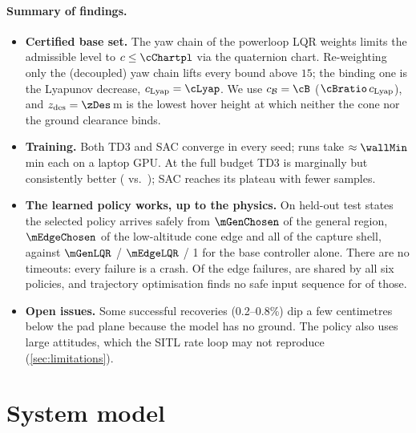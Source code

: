 \documentclass[11pt,a4paper]{article}
\newcommand{\B}{\mathcal{B}}
\newcommand{\zd}{z_{\mathrm{des}}}
\begin{document}
\paragraph{Summary of findings.}
\begin{itemize}
\item \textbf{Certified base set.} The yaw chain of the powerloop LQR weights limits the admissible level to
$c\le\cChartpl$ via the quaternion chart. Re-weighting only the (decoupled) yaw chain lifts every bound
above $15$; the binding one is the Lyapunov decrease, $c_{\mathrm{Lyap}}=\cLyap$. We use $c_{\B}=\cB$
($\cBratio\,c_{\mathrm{Lyap}}$), and $\zd=\zDes$\,m is the lowest hover height at which neither the cone
nor the ground clearance binds.
\item \textbf{Training.} Both TD3 and SAC converge in every seed; runs take $\approx\wallMin$\,min each on a
laptop GPU. At the full budget TD3 is marginally but consistently better (\muTDthree{} vs.\ \muSAC{}); SAC
reaches its plateau with fewer samples.
\item \textbf{The learned policy works, up to the physics.} On held-out test states the selected policy
arrives safely from $\mGenChosen$ of the general region, $\mEdgeChosen$ of the low-altitude cone edge and
all of the capture shell, against $\mGenLQR$ / $\mEdgeLQR$ / 1 for the base controller alone. There are no
timeouts: every failure is a crash. Of the \edgeFailChosen{} edge failures, \edgeShared{} are shared by all six
policies, and trajectory optimisation finds no safe input sequence for \edgeNonviable{} of those.
\item \textbf{Open issues.} Some successful recoveries (0.2--0.8\%) dip a few centimetres below the pad
plane because the model has no ground. The policy also uses large attitudes, which the SITL rate loop may not
reproduce (\cref{sec:limitations}).
\end{itemize}

\section{System model}
\end{document}
